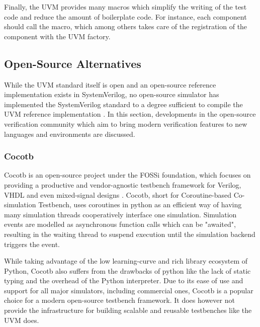 Finally, the UVM provides many macros which simplify the writing of the test code and reduce the amount of
boilerplate code. For instance, each component should call the  macro, which among
others takes care of the registration of the component with the UVM factory.


\subsection{Open-Source Alternatives} %

While the UVM standard itself is open and an open-source reference implementation exists in SystemVerilog, no open-source simulator has implemented the SystemVerilog standard to a degree sufficient to compile the UVM reference implementation \cite{Sasselli2023}. In this section, developments in the open-source verification community which aim to bring modern verification features to new languages and environments are discussed.

\subsubsection{Cocotb} %

Cocotb is an open-source project under the FOSSi foundation, which focuses on providing a productive and
vendor-agnostic testbench framework for Verilog, VHDL and even mixed-signal designs \cite{cocotb}. Cocotb, short for
Coroutine-based Co-simulation Testbench, uses coroutines in python as an efficient way of having many simulation
threads cooperatively interface one simulation. Simulation events are modelled as asynchronous function calls which
can be "awaited", resulting in the waiting thread to suspend execution until the simulation backend triggers the event.

While taking advantage of the low learning-curve and rich library ecosystem of Python, Cocotb also suffers from the
drawbacks of python like the lack of static typing and the overhead of the Python interpreter. Due to its ease of use
and support for all major simulators, including commercial ones, Cocotb is a popular choice for a modern open-source
testbench framework. It does however not provide the infrastructure for building scalable and reusable testbenches
like the UVM does.

